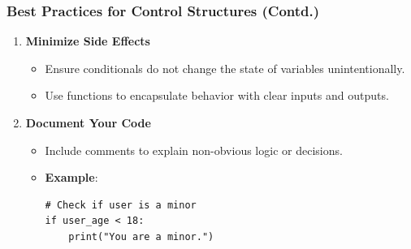 \documentclass{beamer}
\begin{document}
\begin{frame}[fragile]
    \frametitle{Best Practices for Control Structures (Contd.)}
    \begin{enumerate}[resume]
        \item \textbf{Minimize Side Effects}
        \begin{itemize}
            \item Ensure conditionals do not change the state of variables unintentionally.
            \item Use functions to encapsulate behavior with clear inputs and outputs.
        \end{itemize}

        \item \textbf{Document Your Code}
        \begin{itemize}
            \item Include comments to explain non-obvious logic or decisions.
            \item \textbf{Example}: 
            \begin{lstlisting}
# Check if user is a minor
if user_age < 18:
    print("You are a minor.")
            \end{lstlisting}
        \end{itemize}
    \end{enumerate}
\end{frame}
\end{document}
